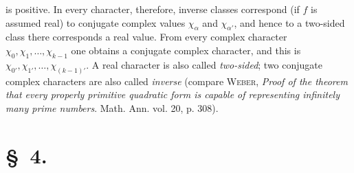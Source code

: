 \documentclass[11pt]{article}
\begin{document}
is positive. In every character, therefore, inverse classes correspond (if $f$ is assumed real) to conjugate complex values $\chi_\alpha$ and $\chi_{\alpha'}$, and hence to a two-sided class there corresponds a real value. From every complex character $\chi_0,\chi_1,\ldots,\chi_{k-1}$ one obtains a conjugate complex character, and this is $\chi_{0'},\chi_{1'},\ldots,\chi_{(k-1)'}$. A real character is also called \emph{two-sided}; two conjugate complex characters are also called \emph{inverse} (compare \textsc{Weber}, \emph{Proof of the theorem that every properly primitive quadratic form is capable of representing infinitely many prime numbers}. Math. Ann. vol. 20, p. 308).

\section*{\S~4.}
\end{document}
